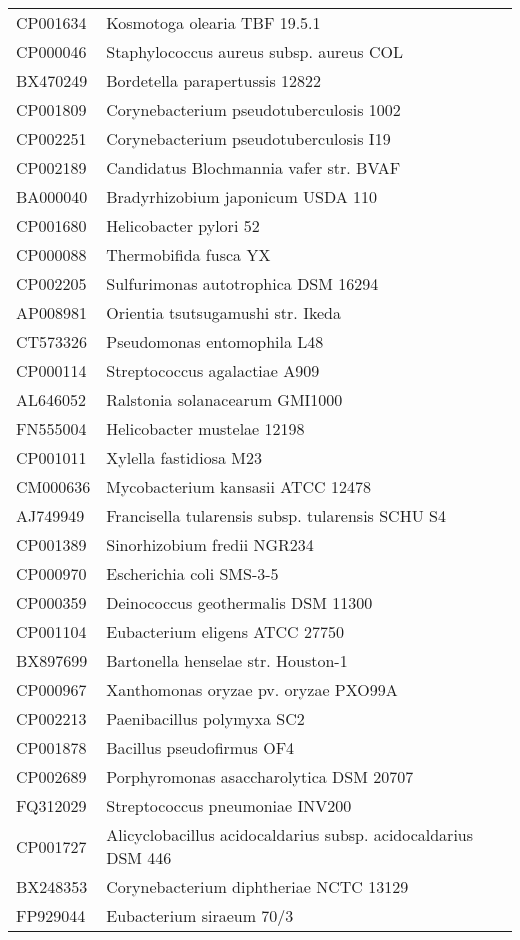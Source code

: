 \begin{longtable}{ll}
CP001634 & Kosmotoga olearia TBF 19.5.1\\
CP000046 & Staphylococcus aureus subsp. aureus COL\\
BX470249 & Bordetella parapertussis 12822\\
CP001809 & Corynebacterium pseudotuberculosis 1002\\
CP002251 & Corynebacterium pseudotuberculosis I19\\
CP002189 & Candidatus Blochmannia vafer str. BVAF\\
BA000040 & Bradyrhizobium japonicum USDA 110\\
CP001680 & Helicobacter pylori 52\\
CP000088 & Thermobifida fusca YX\\
CP002205 & Sulfurimonas autotrophica DSM 16294\\
AP008981 & Orientia tsutsugamushi str. Ikeda\\
CT573326 & Pseudomonas entomophila L48\\
CP000114 & Streptococcus agalactiae A909\\
AL646052 & Ralstonia solanacearum GMI1000\\
FN555004 & Helicobacter mustelae 12198\\
CP001011 & Xylella fastidiosa M23\\
CM000636 & Mycobacterium kansasii ATCC 12478\\
AJ749949 & Francisella tularensis subsp. tularensis SCHU S4\\
CP001389 & Sinorhizobium fredii NGR234\\
CP000970 & Escherichia coli SMS-3-5\\
CP000359 & Deinococcus geothermalis DSM 11300\\
CP001104 & Eubacterium eligens ATCC 27750\\
BX897699 & Bartonella henselae str. Houston-1\\
CP000967 & Xanthomonas oryzae pv. oryzae PXO99A\\
CP002213 & Paenibacillus polymyxa SC2\\
CP001878 & Bacillus pseudofirmus OF4\\
CP002689 & Porphyromonas asaccharolytica DSM 20707\\
FQ312029 & Streptococcus pneumoniae INV200\\
CP001727 & Alicyclobacillus acidocaldarius subsp. acidocaldarius DSM 446\\
BX248353 & Corynebacterium diphtheriae NCTC 13129\\
FP929044 & Eubacterium siraeum 70/3\\

\end{longtable}
